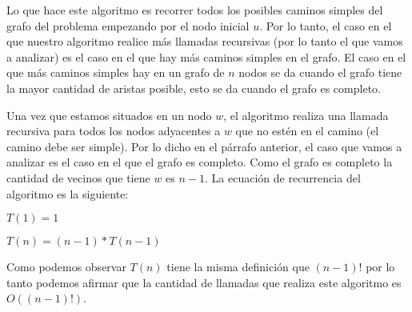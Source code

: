 Lo que hace este algoritmo es recorrer todos los posibles caminos simples del grafo del problema empezando por el nodo inicial $u$. Por lo tanto, el caso en el que nuestro algoritmo realice más llamadas recursivas (por lo tanto el que vamos a analizar) es el caso en el que hay más caminos simples en el grafo. El caso en el que más caminos simples hay en un grafo de $n$ nodos se da cuando el grafo tiene la mayor cantidad de aristas posible, esto se da cuando el grafo es completo. 

Una vez que estamos situados en un nodo $w$, el algoritmo realiza una llamada recursiva para todos los nodos adyacentes a $w$ que no estén en el camino (el camino debe ser simple). Por lo dicho en el párrafo anterior, el caso que vamos a analizar es el caso en el que el grafo es completo. Como el grafo es completo la cantidad de vecinos que tiene $w$ es $n-1$. La ecuación de recurrencia del algoritmo es la siguiente:

\begin{center}
 $T(1) = 1$ 
 
 $T(n) = (n-1)*T(n-1)$
\end{center}

Como podemos observar $T(n)$ tiene la misma definición que $(n-1)!$ por lo tanto podemos afirmar que la cantidad de llamadas que realiza este algoritmo es $O((n-1)!)$.